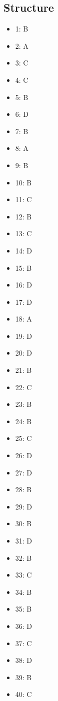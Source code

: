 \documentclass[12pt]{article}
\begin{document}
\subsection*{Structure}
\begin{itemize}[leftmargin=*]
\item 1: B
\item 2: A
\item 3: C
\item 4: C
\item 5: B
\item 6: D
\item 7: B
\item 8: A
\item 9: B
\item 10: B
\item 11: C
\item 12: B
\item 13: C
\item 14: D
\item 15: B
\item 16: D
\item 17: D
\item 18: A
\item 19: D
\item 20: D
\item 21: B
\item 22: C
\item 23: B
\item 24: B
\item 25: C
\item 26: D
\item 27: D
\item 28: B
\item 29: D
\item 30: B
\item 31: D
\item 32: B
\item 33: C
\item 34: B
\item 35: B
\item 36: D
\item 37: C
\item 38: D
\item 39: B
\item 40: C
\end{itemize}
\end{document}
